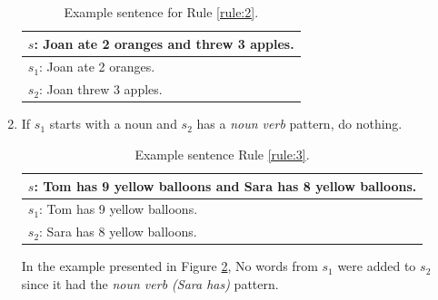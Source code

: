 \documentclass[11pt]{article}
\begin{document}
\begin{enumerate}
\begin{table}[h!]
\centering
\begin{tabular}{ | m{25em} | }
\hline
 \textbf{\begin{math}s\end{math}: Joan ate 2 oranges and threw 3 apples.}\\
\hline
\begin{math}s_{1}\end{math}: Joan ate 2 oranges.\\
\hline
\begin{math}s_{2}\end{math}: Joan threw 3 apples.\\
\hline
\end{tabular}
\caption{Example sentence for Rule \ref{rule:2}.}
\label{figure:10}
\end{table}

\item  \label{rule:3}
If \begin{math}s_{1}\end{math} starts with a noun and \begin{math}s_{2}\end{math} has a \textit{noun verb} pattern, do nothing.

\begin{table}[h!]
\centering
\begin{tabular}{ | m{25em} | }
\hline
 \textbf{\begin{math}s\end{math}: Tom has 9 yellow balloons and Sara has 8 yellow balloons.}\\
\hline
\begin{math}s_{1}\end{math}: Tom has 9 yellow balloons.\\
\hline
\begin{math}s_{2}\end{math}: Sara has 8 yellow balloons.\\
\hline
\end{tabular}
\caption{Example sentence Rule  \ref{rule:3}.}
\label{figure:11}
\end{table}

In the example presented in Figure \ref{figure:11}, No words from \begin{math}s_{1}\end{math} were added to \begin{math}s_{2}\end{math} since it had the \textit{noun verb (Sara has)} pattern.


\end{enumerate}
\end{document}
